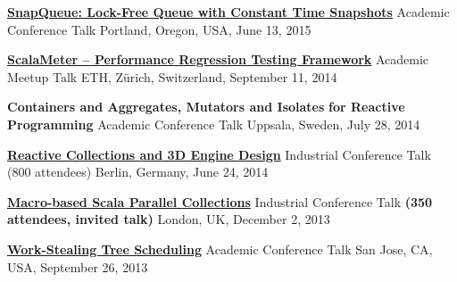 \documentclass[9pt]{article}
\begin{document}
\noindent\href{http://axel22.github.io/slides/snapq.html#/}
{\bf SnapQueue: Lock-Free Queue with Constant Time Snapshots}
\vspace{-0.03in}
\newline\noindent Academic Conference Talk
\dates{}
\linebreak\noindent Portland, Oregon, USA, June 13, 2015
\bigskip

\noindent\href{https://speakerdeck.com/axel22/scalameter-in-2014}
{\bf ScalaMeter -- Performance Regression Testing Framework}
\vspace{-0.03in}
\newline\noindent Academic Meetup Talk
\dates{}
\linebreak\noindent ETH, Zürich, Switzerland, September 11, 2014
\bigskip

\noindent
{\bf Containers and Aggregates, Mutators and Isolates }
\vspace{-0.03in}
\newline
{\bf for Reactive Programming}
\dates{}
\newline\noindent Academic Conference Talk
\dates{}
\linebreak\noindent Uppsala, Sweden, July 28, 2014
\bigskip

\noindent\href{https://www.parleys.com/tutorial/53a7d2cde4b0543940d9e561/chapter1/about}
{\bf Reactive Collections and 3D Engine Design}
\vspace{-0.03in}
\newline\noindent Industrial Conference Talk (800 attendees)
\dates{}
\linebreak\noindent Berlin, Germany, June 24, 2014
\bigskip

\noindent
\href{http://skillsmatter.com/podcast/scala/macro-based-scala-parallel-collections}
{\bf Macro-based Scala Parallel Collections}
\vspace{-0.03in}
\newline\noindent Industrial Conference Talk \textbf{(350 attendees, invited talk)}
\dates{}
\linebreak\noindent London, UK, December 2, 2013
\bigskip

\noindent\href{http://axel22.github.io/resources/docs/lcpc13.pptx}
{\bf Work-Stealing Tree Scheduling}
\vspace{-0.03in}
\newline\noindent Academic Conference Talk
\dates{}
\linebreak\noindent San Jose, CA, USA, September 26, 2013
\bigskip
\end{document}
